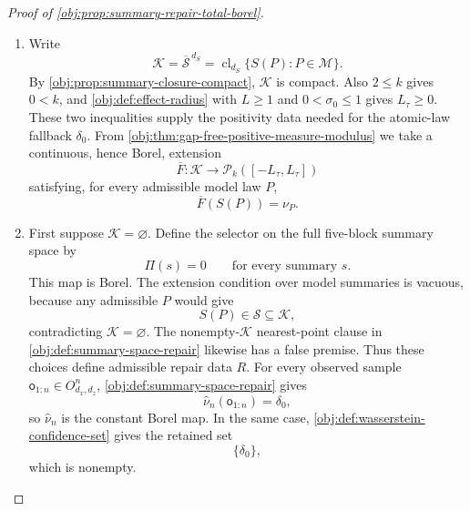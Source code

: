 \documentclass[11pt]{article}
\begin{document}
\begin{proof}[Proof of \cref{obj:prop:summary-repair-total-borel}]
\begin{enumerate}
\item Write
\[
\mathcal K=\overline{\mathscr S}^{\,d_S}
       =\operatorname{cl}_{d_S}\{S(P):P\in\mathcal M\}.
\]
By \cref{obj:prop:summary-closure-compact}, \(\mathcal K\) is compact.  Also \(2\le k\) gives \(0<k\), and \cref{obj:def:effect-radius} with \(L\ge 1\) and \(0<\sigma_0\le 1\) gives \(L_\tau\ge 0\).  These two inequalities supply the positivity data needed for the atomic-law fallback \(\delta_0\).  From \cref{obj:thm:gap-free-positive-measure-modulus} we take a continuous, hence Borel, extension
\[
\overline F:\mathcal K\longrightarrow \mathcal P_k([-L_\tau,L_\tau])
\]
satisfying, for every admissible model law \(P\),
\[
\overline F(S(P))=\nu_P .
\]
\hfill{}%

\item First suppose \(\mathcal K=\varnothing\).  Define the selector on the full five-block summary space by
\[
\Pi(s)=0\qquad\text{for every summary }s .
\]
This map is Borel.  The extension condition over model summaries is vacuous, because any admissible \(P\) would give
\[
S(P)\in\mathscr S\subseteq \mathcal K,
\]
contradicting \(\mathcal K=\varnothing\).  The nonempty-\(\mathcal K\) nearest-point clause in \cref{obj:def:summary-space-repair} likewise has a false premise.  Thus these choices define admissible repair data \(R\).  For every observed sample \(\mathsf o_{1:n}\in O_{d_x,d_z}^n\), \cref{obj:def:summary-space-repair} gives
\[
\widehat\nu_n(\mathsf o_{1:n})
=\delta_0,
\]
so \(\widehat\nu_n\) is the constant Borel map.  In the same case, \cref{obj:def:wasserstein-confidence-set} gives the retained set
\[
\{\delta_0\},
\]
which is nonempty. \hfill{}%


\end{enumerate}
\end{proof}
\end{document}
